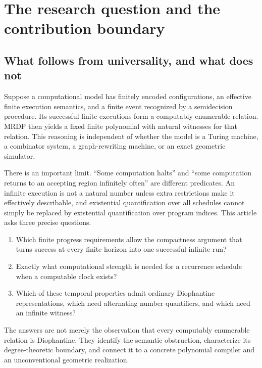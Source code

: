 \documentclass[11pt,letterpaper]{article}
\theoremstyle{definition}
\theoremstyle{remark}
\newcommand{\1}{\mathbf 1}
\begin{document}
\begingroup
\setlength{\parskip}{0pt}
\small
\tableofcontents
\endgroup
\newpage
\section{The research question and the contribution boundary}\label{lbh:sec:intro}

\subsection{What follows from universality, and what does not}
Suppose a computational model has finitely encoded configurations, an
effective finite execution semantics, and a finite event recognized by a
semidecision procedure. Its successful finite executions form a computably
enumerable relation. MRDP \cite{matiyasevich1970} then yields a fixed finite polynomial with natural
witnesses for that relation. This reasoning is independent of whether the
model is a Turing machine, a combinator system, a graph-rewriting machine,
or an exact geometric simulator.

There is an important limit. ``Some computation halts'' and ``some computation
returns to an accepting region infinitely often'' are different predicates.
An infinite execution is not a natural number unless extra restrictions make
it effectively describable, and existential quantification over all schedules
cannot simply be replaced by existential quantification over program indices.
This article asks three precise questions.

\begin{enumerate}[label=\textbf{Q\arabic*.},leftmargin=2.3em]
\item Which finite progress requirements allow the compactness argument that
turns success at every finite horizon into one successful infinite run?
\item Exactly what computational strength is needed for a recurrence schedule
when a computable clock exists?
\item Which of these temporal properties admit ordinary Diophantine
representations, which need alternating number quantifiers, and which need
an infinite witness?
\end{enumerate}

The answers are not merely the observation that every computably enumerable
relation is Diophantine. They identify the semantic obstruction, characterize
its degree-theoretic boundary, and connect it to a concrete polynomial
compiler and an unconventional geometric realization.
\end{document}
